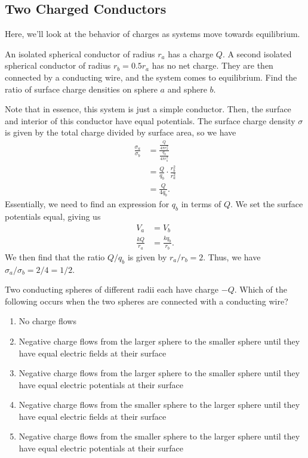 \documentclass[11pt]{article}
\begin{document}
\subsection{Two Charged Conductors}
Here, we'll look at the behavior of charges as systems move towards equilibrium.
\begin{example}
    An isolated spherical conductor of radius $r_a$ has a charge $Q$. A second isolated spherical conductor of radius $r_b = 0.5r_a$ has no net charge. They are then connected by a conducting wire, and the system comes to equilibrium. Find the ratio of surface charge densities on sphere $a$ and sphere $b$.
\end{example}
\begin{solution}
    Note that in essence, this system is just a simple conductor. Then, the surface and interior of this conductor have equal potentials. The surface charge density $\sigma$ is given by the total charge divided by surface area, so we have
    \begin{align*}
        \frac{\sigma_a}{\sigma_b} &= \frac{\frac{Q}{4\pi r_a^2}}{\frac{q_b}{4\pi r_b^2}} \\
        &= \frac{Q}{q_b} \cdot \frac{r_b^2}{r_a^2} \\
        &= \frac{Q}{4q_b}.
    \end{align*}
    Essentially, we need to find an expression for $q_b$ in terms of $Q$. We set the surface potentials equal, giving us
    \begin{align*}
        V_a &= V_b \\
        \frac{kQ}{r_a} &= \frac{kq_b}{r_b}.
    \end{align*}
    We then find that the ratio $Q/q_b$ is given by $r_a/r_b = 2$. Thus, we have $\sigma_a/\sigma_b = 2/4 = 1/2$.
\end{solution}
\begin{example}
    Two conducting spheres of different radii each have charge $-Q$. Which of the following occurs when the two spheres are connected with a conducting wire?
    \begin{enumerate}[noitemsep, label=(\alph*)]
        \item No charge flows
        \item Negative charge flows from the larger sphere to the smaller sphere until they have equal electric fields at their surface
        \item Negative charge flows from the larger sphere to the smaller sphere until they have equal electric potentials at their surface
        \item Negative charge flows from the smaller sphere to the larger sphere until they have equal electric fields at their surface
        \item Negative charge flows from the smaller sphere to the larger sphere until they have equal electric potentials at their surface
    \end{enumerate}
\end{example}
\end{document}
